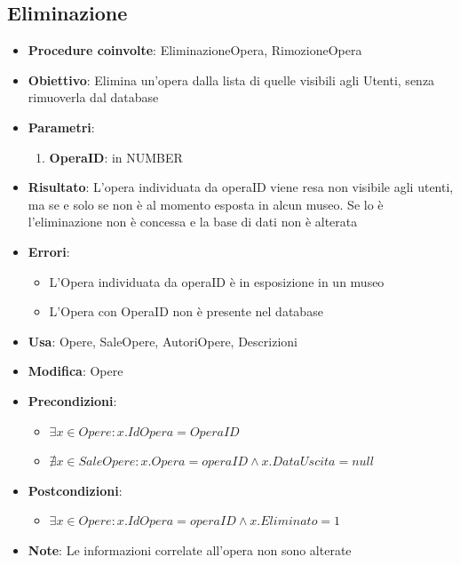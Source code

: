 \subsection{Eliminazione}
\begin{itemize}
	\item \textbf{Procedure coinvolte}: EliminazioneOpera, RimozioneOpera
	\item \textbf{Obiettivo}: Elimina un'opera dalla lista di quelle visibili agli Utenti, senza rimuoverla dal database
	\item \textbf{Parametri}:
	\begin{enumerate}
		\item \textbf{OperaID}: in NUMBER
	\end{enumerate}
	\item \textbf{Risultato}: L'opera individuata da operaID viene resa non visibile agli utenti, ma se e solo se non è al momento esposta in alcun museo. Se lo è l'eliminazione non è concessa e la base di dati non è alterata
	\item \textbf{Errori}: 
	\begin{itemize}
		\item L'Opera individuata da operaID è in esposizione in un museo
		\item L'Opera con OperaID non è presente nel database
	\end{itemize}
	\item \textbf{Usa}: Opere, SaleOpere, AutoriOpere, Descrizioni
	\item \textbf{Modifica}: Opere
	\item \textbf{Precondizioni}:
	\begin{itemize}
		\item $\exists x \in Opere : x.IdOpera = OperaID$
		\item $\nexists x \in SaleOpere : x.Opera=operaID \land x.DataUscita = null$
	\end{itemize}
	\item \textbf{Postcondizioni}:
	\begin{itemize}
		\item $\exists x \in Opere : x.IdOpera = operaID \land x.Eliminato = 1$
	\end{itemize}
	\item \textbf{Note}: Le informazioni correlate all'opera non sono alterate
\end{itemize}

